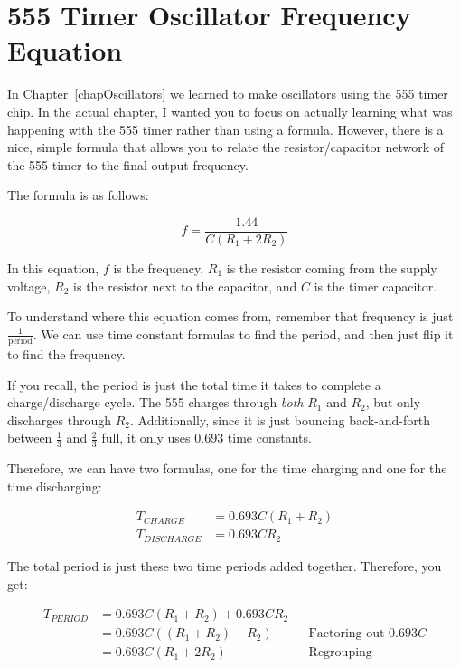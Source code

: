 \section{555 Timer Oscillator Frequency Equation}
\label{apOscillatorFreq}

In Chapter~\ref{chapOscillators} we learned to make oscillators using the 555 timer chip.
In the actual chapter, I wanted you to focus on actually learning what was happening with the 555 timer rather than using a formula.
However, there is a nice, simple formula that allows you to relate the resistor/capacitor network of the 555 timer to the final output frequency.

The formula is as follows:

\begin{equation}
f = \frac{1.44}{C(R_1 + 2 R_2)}
\end{equation}

In this equation, $f$ is the frequency, $R_1$ is the resistor coming from the supply voltage, $R_2$ is the resistor next to the capacitor, and $C$ is the timer capacitor.

To understand where this equation comes from, remember that frequency is just $\frac{1}{\textrm{period}}$.
We can use time constant formulas to find the period, and then just flip it to find the frequency.

If you recall, the period is just the total time it takes to complete a charge/discharge cycle.  
The 555 charges through \emph{both} $R_1$ and $R_2$, but only discharges through $R_2$.
Additionally, since it is just bouncing back-and-forth between $\frac{1}{3}$ and $\frac{2}{3}$ full, it only uses $0.693$ time constants.

Therefore, we can have two formulas, one for the time charging and one for the time discharging:

\begin{align*}
T_{CHARGE} &= 0.693 C (R_1 + R_2) \\
T_{DISCHARGE} &= 0.693 C R_2
\end{align*}

The total period is just these two time periods added together.
Therefore, you get:

\begin{align*}
T_{PERIOD} &= 0.693 C (R_1 + R_2) + 0.693 C R_2 \\
 &= 0.693 C((R_1 + R_2) + R_2) && \textrm{Factoring out $0.693 C$} \\
 &= 0.693 C(R_1 + 2 R_2) && \textrm{Regrouping}
\end{align*}

